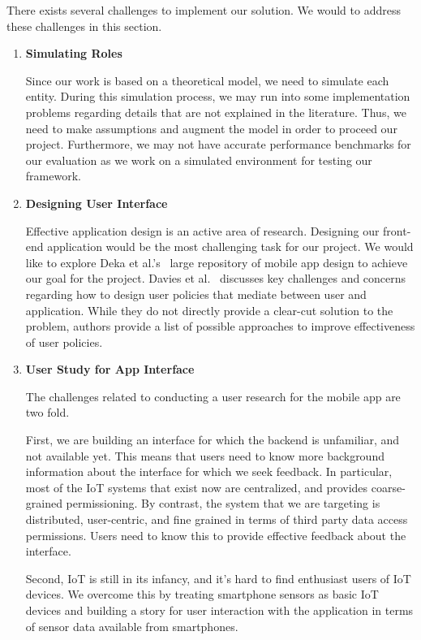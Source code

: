 There exists several challenges to implement our solution. We would to address these challenges in this section. 

\begin{enumerate}
\item \textbf{Simulating Roles}

Since our work is based on a theoretical model, we need to simulate each entity. During this simulation process, we may run into some implementation problems regarding details that are not explained in the literature. Thus, we need to make assumptions and augment the model in order to proceed our project. Furthermore, we may not have accurate performance benchmarks for our evaluation as we work on a simulated environment for testing our framework. 

\item \textbf{Designing User Interface}

Effective application design is an active area of research. Designing our front-end application would be the most challenging task for our project. We would like to explore Deka et al.'s~\cite{rico} large repository of mobile app design to achieve our goal for the project. Davies et al.~\cite{davies} discusses key challenges and concerns regarding how to design user policies that mediate between user and application. While they do not directly provide a clear-cut solution to the problem, authors provide a list of possible approaches to improve effectiveness of user policies.  

\item \textbf{User Study for App Interface}

The challenges related to conducting a user research for the mobile app are two fold.

First, we are building an interface for which the backend is unfamiliar, and not available yet. This means that users need to know more background information about the interface for which we seek feedback. In particular, most of the IoT systems that exist now are centralized, and provides coarse-grained permissioning. By contrast, the system that we are targeting is distributed, user-centric, and fine grained in terms of third party data access permissions. Users need to know this to provide effective feedback about the interface.

Second, IoT is still in its infancy, and it's hard to find enthusiast users of IoT devices. We overcome this by treating smartphone sensors as basic IoT devices and building a story for user interaction with the application in terms of sensor data available from smartphones.
\end{enumerate}